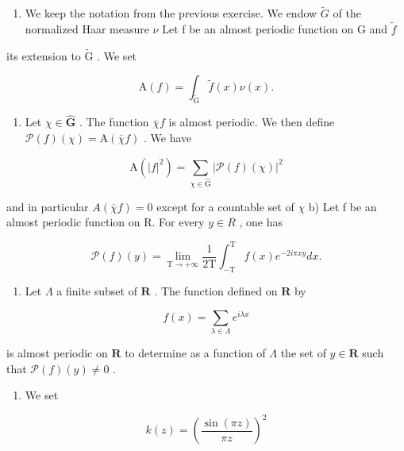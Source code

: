 \begin{enumerate}
\def\labelenumi{\arabic{enumi})}
\setcounter{enumi}{54}
\tightlist
\item
  We keep the notation from the previous exercise. We endow \(\widetilde{G}\) of the normalized Haar measure \(\nu\) Let f be an almost periodic function on G and \(\widetilde{f}\)
\end{enumerate}

its extension to \(\widetilde{\mathrm{G}}\) . We set

\[
\mathrm{A} (f) = \int_ {\widetilde {\mathrm{G}}} \widetilde {f} (x) \nu (x).
\]

\begin{enumerate}
\def\labelenumi{\alph{enumi})}
\tightlist
\item
  Let \(\chi \in \widehat{\mathbf{G}}\) . The function \(\overline{\chi} f\) is almost periodic. We then define \(\mathcal{P}(f)(\chi) = \mathrm{A}(\overline{\chi} f)\) . We have
\end{enumerate}

\[
\mathrm{A} (| f | ^ {2}) = \sum_ {\chi \in \widehat {\mathrm{G}}} | \mathcal {P} (f) (\chi) | ^ {2}
\]

    and in particular \(A(\overline{\chi}f)=0\) except for a countable set of \(\chi\) b) Let f be an almost periodic function on R. For every \(y \in R\) , one has

\[
\mathcal {P} (f) (y) = \lim _ {\mathrm{T} \to + \infty} \frac {1}{2 \mathrm{T}} \int_ {- \mathrm{T}} ^ {\mathrm{T}} f (x) e ^ {- 2 i \pi x y} d x.
\]

\begin{enumerate}
\def\labelenumi{\alph{enumi})}
\setcounter{enumi}{2}
\tightlist
\item
  Let \(\Lambda\) a finite subset of \(\mathbf{R}\) . The function defined on \(\mathbf{R}\) by
\end{enumerate}

\[
f (x) = \sum_ {\lambda \in \Lambda} e ^ {i \lambda x}
\]

is almost periodic on \(\mathbf{R}\) to determine as a function of \(\Lambda\) the set of \(y \in \mathbf{R}\) such that \(\mathcal{P}(f)(y) \neq 0\) .

\begin{enumerate}
\def\labelenumi{\arabic{enumi})}
\setcounter{enumi}{55}
\tightlist
\item
  We set
\end{enumerate}

\[
k (z) = \left(\frac {\sin (\pi z)}{\pi z}\right) ^ {2}
\]

